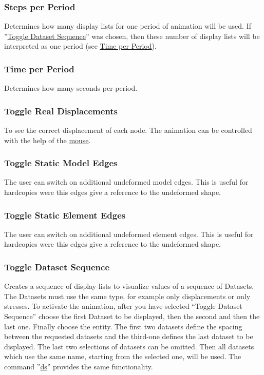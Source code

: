 \documentclass{article}
\providecommand{\htmlref}[2]{\hyperref[#2]{#1}}
\begin{document}
\subsubsection{\label{Steps per Period}Steps per Period}
Determines how many display lists for one period of animation will be used. If ''\htmlref{Toggle Dataset Sequence}{Toggle Dataset Sequence}'' was chosen, then these number of display lists will be interpreted as one period (see \htmlref{Time per Period}{Time per Period}).

\subsubsection{\label{Time per Period}Time per Period}
Determines how many seconds per period. 

\subsubsection{\label{Toggle Real Displacements}Toggle Real Displacements}
To see the correct displacement of each node. The animation can be controlled with the help of the \htmlref{mouse}{Mouse}.

\subsubsection{\label{Toggle Static Model Edges}Toggle Static Model Edges}
The user can switch on additional undeformed model edges. This is useful for hardcopies were this edges give a reference to the undeformed shape.

\subsubsection{\label{Toggle Static Element Edges}Toggle Static Element Edges}
The user can switch on additional undeformed element edges. This is useful for hardcopies were this edges give a reference to the undeformed shape.

\subsubsection{\label{Toggle Dataset Sequence}Toggle Dataset Sequence}
Creates a sequence of display-lists to visualize values of a sequence of Datasets. The Datasets must use the same type, for example only displacements or only stresses. To activate the animation, after you have selected ``Toggle Dataset Sequence'' choose the first Dataset to be displayed, then the second  and then the last one. Finally choose the entity. The first two datasets define the spacing between the requested datasets and the third-one defines the last dataset to be displayed. The last two selections of datasets can be omitted. Then all datasets which use the same name, starting from the selected one, will be used. The command ''\htmlref{ds}{ds}'' provides the same functionality. 
\end{document}
